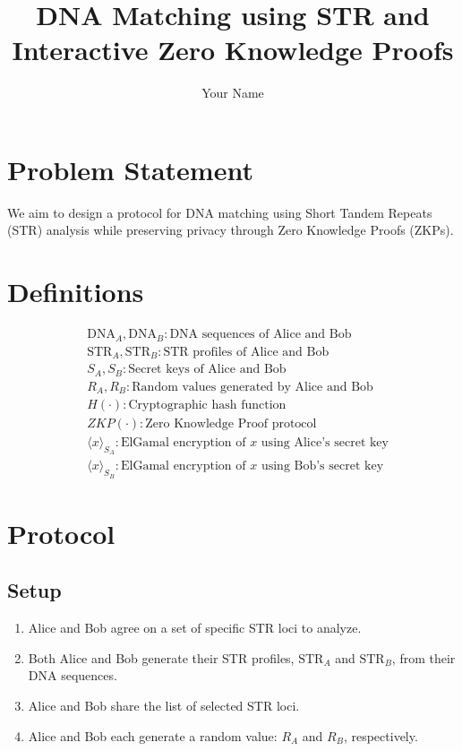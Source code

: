 \documentclass{article}
\begin{document}
\title{DNA Matching using STR and Interactive Zero Knowledge Proofs}
\author{Your Name}
\maketitle

\section{Problem Statement}
We aim to design a protocol for DNA matching using Short Tandem Repeats (STR) analysis while preserving privacy through Zero Knowledge Proofs (ZKPs).

\section{Definitions}

\begin{align*}
    &\text{DNA}_A, \text{DNA}_B: \text{DNA sequences of Alice and Bob} \\
    &\text{STR}_A, \text{STR}_B: \text{STR profiles of Alice and Bob} \\
    &S_A, S_B: \text{Secret keys of Alice and Bob} \\
    &R_A, R_B: \text{Random values generated by Alice and Bob} \\
    &H(\cdot): \text{Cryptographic hash function} \\
    &ZKP(\cdot): \text{Zero Knowledge Proof protocol} \\
    &\langle x \rangle_{S_A}: \text{ElGamal encryption of $x$ using Alice's secret key} \\
    &\langle x \rangle_{S_B}: \text{ElGamal encryption of $x$ using Bob's secret key}
\end{align*}

\section{Protocol}

\subsection{Setup}

\begin{enumerate}
    \item Alice and Bob agree on a set of specific STR loci to analyze.
    \item Both Alice and Bob generate their STR profiles, $\text{STR}_A$ and $\text{STR}_B$, from their DNA sequences.
    \item Alice and Bob share the list of selected STR loci.
    \item Alice and Bob each generate a random value: $R_A$ and $R_B$, respectively.
\end{enumerate}
\end{document}
